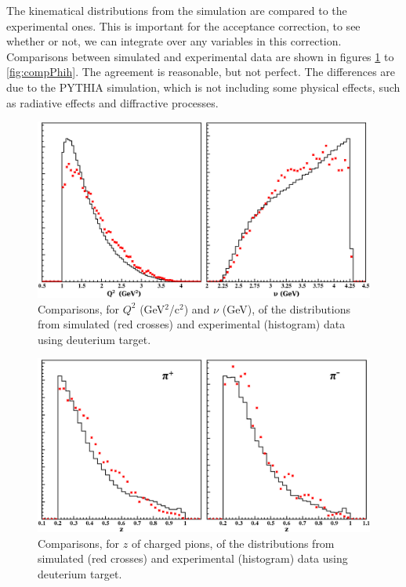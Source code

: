 The kinematical distributions from the simulation are compared to the 
experimental ones. This is important for the acceptance correction, to see 
whether or not, we can integrate over any variables in this correction.
Comparisons between simulated and experimental data are shown in figures 
\ref{fig:compNuQ2} to \ref{fig:compPhih}. The agreement is reasonable, but not 
perfect. The differences are due to the PYTHIA simulation, which is not including some 
physical effects, such as radiative effects and diffractive processes.

\begin{figure}[tbp]
\centering
\includegraphics[width=12cm] {chap5-fig/El_compar.png}
\caption {Comparisons, for $Q^2$ (GeV$^2$/c$^2$) and $\nu$ (GeV), of the distributions
from simulated (red crosses) and experimental (histogram) data using deuterium target.}
\label{fig:compNuQ2}
\end{figure}

\begin{figure}[tbp]
\centering
\includegraphics[width=12cm] {chap5-fig/z_compar.png}
\caption {Comparisons, for $z$ of charged pions, of the distributions
from simulated (red crosses) and experimental (histogram) data using deuterium target.}
\label{fig:compZ}
\end{figure}

